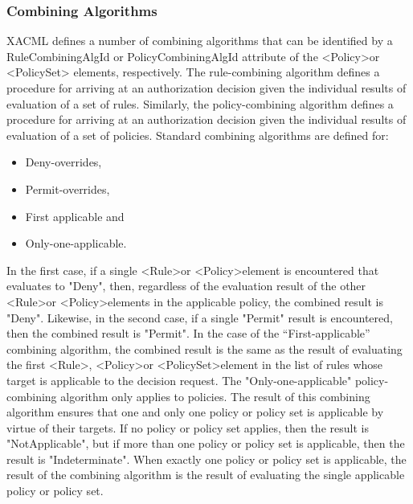 \subsubsection{Combining Algorithms}
\hspace{5mm}XACML defines a number of combining algorithms that can be identified by a
RuleCombiningAlgId or PolicyCombiningAlgId attribute of the \textless Policy\textgreater   or \textless PolicySet\textgreater  
elements, respectively. The rule-combining algorithm defines a procedure for arriving at an
authorization decision given the individual results of evaluation of a set of rules. Similarly, the
policy-combining algorithm defines a procedure for arriving at an authorization decision given
the individual results of evaluation of a set of policies. Standard combining algorithms are defined
for:
\begin{itemize}
\item Deny-overrides,
\item Permit-overrides,
\item First applicable and
\item Only-one-applicable.
\end{itemize}
In the first case, if a single \textless Rule\textgreater   or <Policy\textgreater   element is encountered that evaluates to "Deny",
then, regardless of the evaluation result of the other \textless Rule\textgreater   or \textless Policy\textgreater   elements in the
applicable policy, the combined result is "Deny". Likewise, in the second case, if a single "Permit"
result is encountered, then the combined result is "Permit". In the case of the “First-applicable” combining algorithm, the combined result is the same as the result of evaluating the first \textless Rule\textgreater  ,
\textless Policy\textgreater   or \textless PolicySet\textgreater   element in the list of rules whose target is applicable to the decision
request. The "Only-one-applicable" policy-combining algorithm only applies to policies. The
result of this combining algorithm ensures that one and only one policy or policy set is applicable
by virtue of their targets. If no policy or policy set applies, then the result is "NotApplicable", but if
more than one policy or policy set is applicable, then the result is "Indeterminate". When exactly
one policy or policy set is applicable, the result of the combining algorithm is the result of
evaluating the single applicable policy or policy set.

